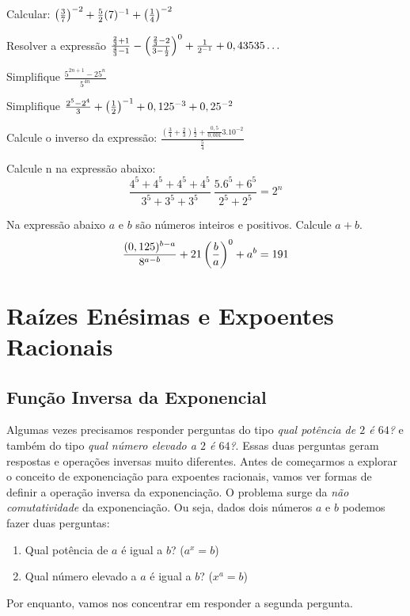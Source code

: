 \begin{exer}[CN-Modificado]
Calcular: $\left ( \frac{3}{7} \right)^{-2} + \frac{5}{2}(7)^{-1} + \left ( \frac{1}{4} \right)^{-2}$
\end{exer}
\begin{exer}[CN] Resolver a expressão $\frac{\frac{2}{3}+1}{\frac{4}{3}-1}-\left ( \frac{\frac{2}{3}-2}{3-\frac{1}{2}} \right)^0 + \frac{1}{2^{-1}} + 0,43535\ldots$
\end{exer}
\begin{exer}
Simplifique $\frac{5^{2n+1} - 25^n}{5^{4n}}$
\end{exer}
\begin{exer}
Simplifique $\frac{2^5 - 2^4}{3} + \left ( \frac{1}{2} \right)^{-1} + 0,125^{-3} + 0,25^{-2}$
\end{exer}
\begin{exer}Calcule o inverso da expressão:
$\frac{\left( \frac{3}{4}+\frac{2}{3}\right)\frac{1}{2} + \frac{0,5}{0,001}3.10^{-2}}{\frac{5}{4}}$
\end{exer}
\begin{exer}
Calcule n na expressão abaixo: $$\frac{4^5+4^5+4^5+4^5}{3^5+3^5+3^5}\ \frac{5.6^5+6^5}{2^5+2^5} = 2^n $$
\end{exer}
\begin{exer}[CN]Na expressão abaixo $a$ e $b$ são números inteiros e positivos. Calcule $a+b$. $$\frac{(0,125)^{b-a}}{8^{a-b}}+21\left ( \frac{b}{a} \right)^0+a^b=191$$
\end{exer}
\terminaexer
\newpage
\section{Raízes Enésimas e Expoentes Racionais}
\subsection{Função Inversa da Exponencial}
Algumas vezes precisamos responder perguntas do tipo \textit{qual potência de $2$ é $64$?} e também do tipo \textit{qual número elevado a $2$ é $64$?}. Essas duas perguntas geram respostas e operações inversas muito diferentes. Antes de começarmos a explorar o conceito de exponenciação para expoentes racionais, vamos ver formas de definir a operação inversa da exponenciação. O problema surge da \textit{não comutatividade} da exponenciação. Ou seja, dados dois números $a$ e $b$ podemos fazer duas perguntas: 
\begin{enumerate}[1)] 
\item Qual potência de $a$ é igual a $b$? ($a^x=b$)
\item Qual número elevado a $a$ é igual a $b$? ($x^a=b$)
\end{enumerate}
Por enquanto, vamos nos concentrar em responder a segunda pergunta.
